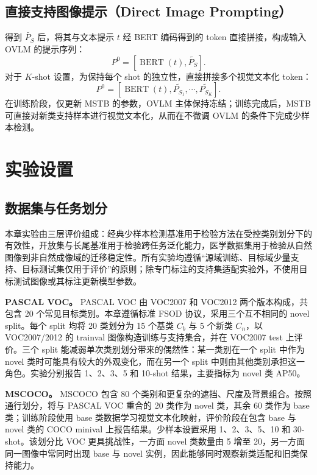 \subsection{直接支持图像提示（Direct Image Prompting）}
得到 $\widetilde{P_S}$ 后，将其与文本提示 $t$ 经 BERT 编码得到的 token 直接拼接，构成输入 OVLM 的提示序列：
\begin{equation}
    P^0 = \left[ \operatorname{BERT}\left(t\right), \widetilde{P_S} \right].
\label{eq:vistex_prompt_1shot}
\end{equation}
对于 $K$-shot 设置，为保持每个 shot 的独立性，直接拼接多个视觉文本化 token：
\begin{equation}
    P^0 = \left[ \operatorname{BERT}\left(t\right), \widetilde{P_{S_1}}, \cdots, \widetilde{P_{S_K}} \right].
\label{eq:vistex_prompt_kshot}
\end{equation}
在训练阶段，仅更新 MSTB 的参数，OVLM 主体保持冻结；训练完成后，MSTB 可直接对新类支持样本进行视觉文本化，从而在不微调 OVLM 的条件下完成少样本检测。

\section{实验设置}

\subsection{数据集与任务划分}
本章实验由三层评价组成：经典少样本检测基准用于检验方法在受控类别划分下的有效性，开放集与长尾基准用于检验跨任务泛化能力，医学数据集用于检验从自然图像到非自然成像域的迁移稳定性。所有实验均遵循“源域训练、目标域少量支持、目标测试集仅用于评价”的原则；除专门标注的支持集适配实验外，不使用目标测试图像或其标注更新模型参数。

\textbf{PASCAL VOC。} PASCAL VOC 由 VOC2007 和 VOC2012 两个版本构成，共包含 20 个常见目标类别\cite{everingham2010pascalvoc}。本章遵循标准 FSOD 协议\cite{wang2020frustratingly,zhang2022metaDETR1}，采用三个互不相同的 novel split。每个 split 均将 20 类划分为 15 个基类 $C_b$ 与 5 个新类 $C_n$，以 VOC2007/2012 的 trainval 图像构造训练与支持集合，并在 VOC2007 test 上评价。三个 split 能减弱单次类别划分带来的偶然性：某一类别在一个 split 中作为 novel 类时可能具有较大的外观变化，而在另一个 split 中则由其他类别承担这一角色。实验分别报告 1、2、3、5 和 10-shot 结果，主要指标为 novel 类 AP50。

\textbf{MSCOCO。} MSCOCO 包含 80 个类别和更复杂的遮挡、尺度及背景组合\cite{lin2014microsoftCOCO}。按照通行划分，将与 PASCAL VOC 重合的 20 类作为 novel 类，其余 60 类作为 base 类；训练阶段使用 base 类数据学习视觉文本化映射，评价阶段在包含 base 与 novel 类的 COCO minival 上报告结果。少样本设置采用 1、2、3、5、10 和 30-shot。该划分比 VOC 更具挑战性，一方面 novel 类数量由 5 增至 20，另一方面同一图像中常同时出现 base 与 novel 实例，因此能够同时观察新类适配和旧类保持能力。

